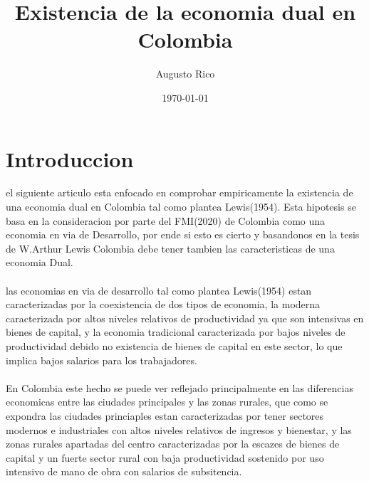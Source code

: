 \documentclass[12pt,letterpaper]{article}
\title{Existencia de la economia dual en Colombia}
\author{Augusto Rico}
\date{\today}
\begin{document}
\maketitle
\section{Introduccion}

\begin{flushleft}   


el siguiente articulo esta enfocado en comprobar empiricamente la existencia de una economia dual en Colombia tal como plantea Lewis(1954).
Esta hipotesis se basa en la consideracion por parte del FMI(2020) de Colombia como una economia en via de Desarrollo, por ende si esto es cierto 
y basandonos en la tesis de W.Arthur Lewis Colombia debe tener tambien las caracteristicas de una economia Dual.\\
~\\
las economias en via de desarrollo tal como plantea Lewis(1954) estan caracterizadas por la coexistencia de dos tipos de economia, la moderna caracterizada
por altos niveles relativos de productividad ya que son intensivas en bienes de capital, y la economia tradicional caracterizada por bajos niveles de productividad
debido no existencia de bienes de capital en este sector, lo que implica bajos salarios para los trabajadores.\\
~\\
En Colombia este hecho se puede ver reflejado principalmente en las diferencias economicas entre las ciudades principales y las zonas rurales, que como se expondra
las ciudades princiaples estan caracterizadas por tener sectores modernos e industriales con altos niveles relativos de ingresos y bienestar, y las zonas rurales
apartadas del centro caracterizadas por la escazes de bienes de capital y un fuerte sector rural con baja productividad sostenido por uso intensivo de mano de obra con salarios de subsitencia.\\
~\\



\end{flushleft}
\end{document}

